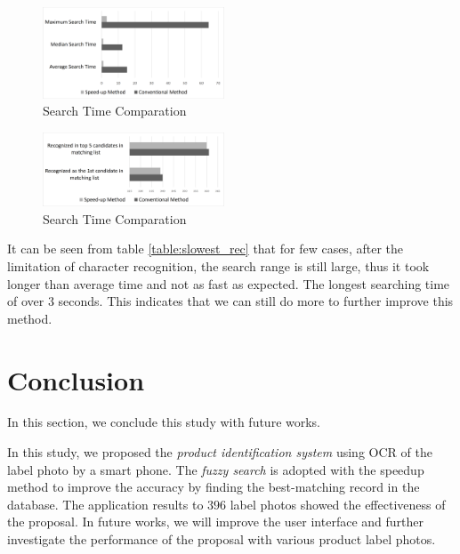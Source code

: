 \documentclass[technicalreport]{ieicej}
\begin{document}
            \begin{figure}[t] 
                \begin{center}
                \includegraphics[width=0.48\textwidth]{figure/graph-time.pdf}
                \end{center}
                \caption{Search Time Comparation}
                \label{fig:graph-time}
            \end{figure}

            \begin{figure}[t] 
                \begin{center}
                \includegraphics[width=0.48\textwidth]{figure/graph-recognized.pdf}
                \end{center}
                \caption{Search Time Comparation}
                \label{fig:graph-recognized}
            \end{figure}

            
            It can be seen from table \ref{table:slowest_rec} that for few cases, after the limitation of character recognition, the search range is still large, thus it took longer than average time and not as fast as expected. The longest searching time of over $3$ seconds. This indicates that we can still do more to further improve this method.
               
     
\section{Conclusion}
\label{sec:conclusion}
    In this section, we conclude this study with future works.

    In this study, we proposed the {\em product identification system} using OCR of the label photo by a smart phone. The {\em fuzzy search} is adopted with the speedup method to improve the accuracy by finding the best-matching record in the database. The application results to $396$ label photos showed the effectiveness of the proposal. In future works, we will improve the user interface and further investigate the performance of the proposal with various product label photos.
            
\end{document}
